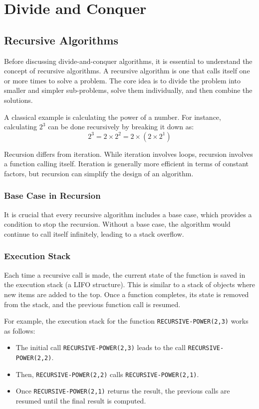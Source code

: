 \chapter{Divide and Conquer}

    \section{Recursive Algorithms}
    Before discussing divide-and-conquer algorithms, it is essential to understand the concept of recursive algorithms. A recursive algorithm is one that calls itself one or more times to solve a problem. The core idea is to divide the problem into smaller and simpler sub-problems, solve them individually, and then combine the solutions.
    
    A classical example is calculating the power of a number. For instance, calculating \(2^3\) can be done recursively by breaking it down as:
    \[
    2^3 = 2 \times 2^2 = 2 \times (2 \times 2^1)
    \]
    
    Recursion differs from iteration. While iteration involves loops, recursion involves a function calling itself. Iteration is generally more efficient in terms of constant factors, but recursion can simplify the design of an algorithm.
    
    \subsection{Base Case in Recursion}
    
    It is crucial that every recursive algorithm includes a base case, which provides a condition to stop the recursion. Without a base case, the algorithm would continue to call itself infinitely, leading to a stack overflow.
    
    \subsection{Execution Stack}
    Each time a recursive call is made, the current state of the function is saved in the execution stack (a LIFO structure). This is similar to a stack of objects where new items are added to the top. Once a function completes, its state is removed from the stack, and the previous function call is resumed. 
    
    For example, the execution stack for the function \texttt{RECURSIVE-POWER(2,3)} works as follows:
    
    \begin{itemize}
        \item The initial call \texttt{RECURSIVE-POWER(2,3)} leads to the call \texttt{RECURSIVE-POWER(2,2)}.
        \item Then, \texttt{RECURSIVE-POWER(2,2)} calls \texttt{RECURSIVE-POWER(2,1)}.
        \item Once \texttt{RECURSIVE-POWER(2,1)} returns the result, the previous calls are resumed until the final result is computed.
    \end{itemize}
    

